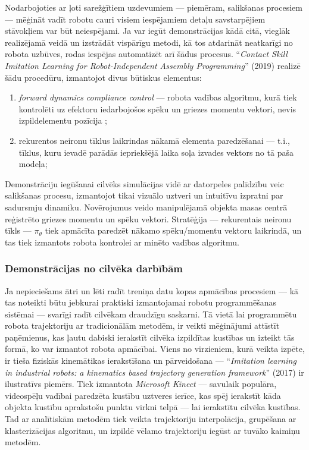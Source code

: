 \documentclass[12pt, a4paper]{article}
\numberwithin{equation}{section} %
\begin{document}
Nodarbojoties ar ļoti sarežģītiem uzdevumiem --- piemēram, salikšanas procesiem --- mēģināt vadīt robotu cauri visiem iespējamiem detaļu savstarpējiem stāvokļiem var būt neiespējami. Ja var iegūt demonstrācijas kādā citā, vieglāk realizējamā veidā un izstrādāt vispārīgu metodi, kā tos atdarināt neatkarīgi no robota uzbūves, rodas iespējas automatizēt arī šādus procesus. ``\textit{Contact Skill Imitation Learning for Robot-Independent Assembly Programming}'' \cite{scherzinger2019contact} (2019) realizē šādu procedūru, izmantojot divus būtiskus elementus:

\begin{enumerate}
    \item \textit{forward dynamics compliance control} --- robota vadības algoritmu, kurā tiek kontrolēti uz efektoru iedarbojošos spēku un griezes momentu vektori, nevis izpildelementu pozīcija \cite{scherzinger2017forward};
    \item rekurentos neironu tīklus laikrindas nākamā elementa paredzēšanai --- t.i., tīklus, kuru ievadē parādās iepriekšējā laika soļa izvades vektors no tā paša modeļa;
\end{enumerate}

Demonstrāciju iegūšanai cilvēks simulācijas vidē ar datorpeles palīdzību veic salikšanas procesu, izmantojot tikai vizuālo uztveri un intuitīvu izpratni par sadursmju dinamiku. Novērojumus veido manipulējamā objekta masas centrā reģistrēto griezes momentu un spēku vektori. Stratēģija --- rekurentais neironu tīkls --- $\pi_{\theta}$ tiek apmācīta paredzēt nākamo spēku/momentu vektoru laikrindā, un tas tiek izmantots robota kontrolei ar minēto vadības algoritmu.

\subsubsection{Demonstrācijas no cilvēka darbībām}

Ja nepieciešams ātri un lēti radīt treniņa datu kopas apmācības procesiem --- kā tas noteikti būtu jebkurai praktiski izmantojamai robotu programmēšanas sistēmai --- svarīgi radīt cilvēkam draudzīgu saskarni. Tā vietā lai programmētu robota trajektoriju ar tradicionālām metodēm, ir veikti mēģinājumi attīstīt paņēmienus, kas ļautu dabiski ierakstīt cilvēka izpildītas kustības un izteikt tās formā, ko var izmantot robota apmācībai. Viens no virzieniem, kurā veikta izpēte, ir tieša fiziskās kinemātikas ierakstīšana un pārveidošana --- ``\textit{Imitation learning in industrial robots: a kinematics based trajectory generation framework}'' \cite{jha2017imitation} (2017) ir ilustratīvs piemērs. Tiek izmantota \textit{Microsoft Kinect} --- savulaik populāra, videospēļu vadībai paredzēta kustību uztveres ierīce, kas spēj ierakstīt kāda objekta kustību aprakstošu punktu virkni telpā --- lai ierakstītu cilvēka kustības. Tad ar analītiskām metodēm tiek veikta trajektoriju interpolācija, grupēšana ar klasterizācijas algoritmu, un izpildē vēlamo trajektoriju iegūst ar tuvāko kaimiņu metodēm.
\end{document}

